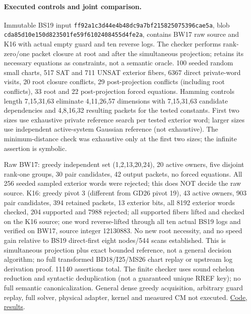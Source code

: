 \documentclass[11pt]{article}
\begin{document}
\paragraph{Executed controls and joint comparison.}
Immutable BS19 input \texttt{ff92a1c3d44e4b48dc9a7bf215825075396cae5a}, blob \texttt{cda85d10e150d823501fe59f6102408455d4fe2a}, contains BW17 raw source and K16 with actual empty guard and ten reverse logs. The checker performs rank-zero/one packet closure at root and after the simultaneous projection; retains its necessary equations as constraints, not a semantic oracle. 100 seeded random small charts, 517 SAT and 711 UNSAT exterior fibers, 6367 direct private-word visits, 20 root closure conflicts, 29 post-projection conflicts (including root conflicts), 33 root and 22 post-projection forced equations. Hamming controls length 7,15,31,63 eliminate 4,11,26,57 dimensions with 7,15,31,63 candidate dependencies and 4,8,16,32 resulting packets for the tested constants. First two sizes use exhaustive private reference search per tested exterior word; larger sizes use independent active-system Gaussian reference (not exhaustive). The minimum-distance check was exhaustive only at the first two sizes; the infinite assertion is symbolic.

Raw BW17: greedy independent set (1,2,13,20,24), 20 active owners, five disjoint rank-one groups, 30 pair candidates, 42 output packets, no forced equations. All 256 seeded sampled exterior words were rejected; this does NOT decide the raw source. K16: greedy pivot 3 (different from GD26 pivot 19), 43 active owners, 903 pair candidates, 394 retained packets, 13 exterior bits, all 8192 exterior words checked, 204 supported and 7988 rejected; all supported fibers lifted and checked on the K16 source; one word reverse-lifted through all ten actual BS19 logs and verified on BW17, source integer 12130883. No new root necessity, and no speed gain relative to BS19 direct-first eight nodes/544 scans established. This is simultaneous projection plus exact bounded reference, not a general decision algorithm; no full transformed BD18/I25/MS26 chart replay or upstream log derivation proof. 11140 assertions total. The finite checker uses sound echelon reduction and syntactic deduplication (not a guaranteed unique RREF key); no full semantic canonicalization. General dense greedy acquisition, arbitrary guard replay, full solver, physical adapter, kernel and measured CM not executed. \href{https://github.com/j15marti/pnp/commit/7ef7946e23d3f93a8f286179c26eb87a7ee26857}{Code}, \href{https://github.com/j15marti/pnp/commit/80b0219f912e3515b3bf6c43940ffca079e2bd6b}{results}.
\end{document}
